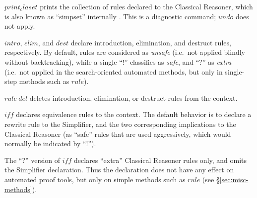 \begin{descr}
\item [$print_claset$] prints the collection of rules declared to the
  Classical Reasoner, which is also known as ``simpset'' internally
  \cite{isabelle-ref}.  This is a diagnostic command; $undo$ does not apply.
\item [$intro$, $elim$, and $dest$] declare introduction, elimination, and
  destruct rules, respectively.  By default, rules are considered as
  \emph{unsafe} (i.e.\ not applied blindly without backtracking), while a
  single ``!'' classifies as \emph{safe}, and ``?'' as \emph{extra} (i.e.\ not
  applied in the search-oriented automated methods, but only in single-step
  methods such as $rule$).
\item [$rule~del$] deletes introduction, elimination, or destruct rules from
  the context.
\item [$iff$] declares equivalence rules to the context.  The default behavior
  is to declare a rewrite rule to the Simplifier, and the two corresponding
  implications to the Classical Reasoner (as ``safe'' rules that are used
  aggressively, which would normally be indicated by ``!'').
  
  The ``?'' version of $iff$ declares ``extra'' Classical Reasoner rules only,
  and omits the Simplifier declaration.  Thus the declaration does not have
  any effect on automated proof tools, but only on simple methods such as
  $rule$ (see \S\ref{sec:misc-methods}).
\end{descr}


